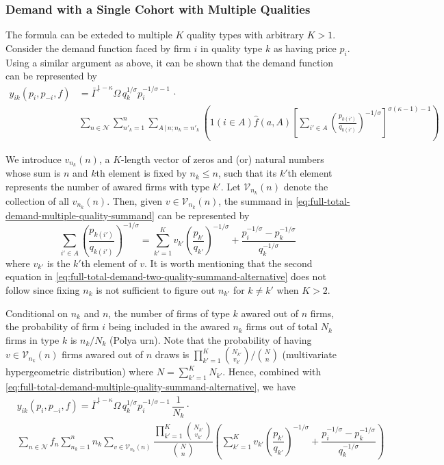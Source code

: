 \documentclass[12pt]{article}
\begin{document}
\subsubsection{Demand with a Single Cohort with Multiple Qualities}
The formula can be exteded to multiple $K$ quality types with arbitrary $K > 1$. Consider the demand function faced by firm $i$ in quality type $k$ as having price $p_i$. Using a similar argument as above, it can be shown that the demand function can be represented by
\begin{align}
y_{ik}(p_i, p_{-i}, f) 
&= \bar{\Gamma}^{1-\kappa}\Omega \, q_k^{1/\sigma}p_i^{-1/\sigma - 1}\, \cdot \\ 
&\sum_{n \in \mathcal{N} } \sum_{n'_k =1}^n \sum_{{A}\,|\,n; n_k = n'_k}\left( 1( i \in A ) \hat{f}(a,A)\left[\sum_{i'\in A}\left( \frac{p_{k(i')}}{q_{k(i')}}\right)^{-1/\sigma}\right]^{\sigma (\kappa - 1)-1}\right)  
\label{eq:full-total-demand-multiple-quality-summand}
\end{align}

We introduce $v_{n_k} (n)$, a $K$-length vector of zeros and (or) natural numbers whose sum is $n$ and $k$th element is fixed by $n_k \leq n$, such that its $k'$th element represents the number of awared firms with type $k'$. Let $\mathcal{V}_{n_k} (n)$ denote the collection of all $v_{n_k} (n)$. Then, given $v \in \mathcal{V}_{n_k} (n)$, the summand in \eqref{eq:full-total-demand-multiple-quality-summand} can be represented by
\begin{equation}
\sum_{i'\in A}\left( \frac{p_{k(i')}}{q_{k(i')}}\right)^{-1/\sigma} = 
\sum_{k' =1 }^{K} v_{k'} \left( \dfrac{p_{k'}}{q_{k'}}  \right)^{-1/\sigma} +   
\dfrac{p_i^{-1/\sigma}   - p^{-1/\sigma}_{k} }{{ q_k^{-1/\sigma }}}
\label{eq:full-total-demand-multiple-quality-summand-alternative}
\end{equation}
where $v_{k'}$ is the $k'$th element of $v$. It is worth mentioning that the second equation in \eqref{eq:full-total-demand-two-quality-summand-alternative} does not follow since fixing $n_k$ is not sufficient to figure out $n_{k'}$ for $k \neq k'$ when $K > 2$.

Conditional on $n_k$ and $n$, the number of firms of type $k$ awared out of $n$ firms, the probability of firm $i$ being included in the awared $n_k$ firms out of total $N_k$ firms in type $k$ is $n_k / N_k$ (Polya urn). Note that the probability of having $v \in \mathcal{V}_{n_k}(n)$ firms awared out of $n$ draws is $\prod_{k'=1}^K \binom{ N_{k'} }{ v_{k'} } / \binom{N}{n}$ (multivariate hypergeometric distribution) where $N = \sum_{k'=1}^K N_{k'}$. Hence, combined with \eqref{eq:full-total-demand-multiple-quality-summand-alternative}, we have
\begin{align}
& y_{ik}(p_i, p_{-i}, f) 
=  \bar{\Gamma}^{1-\kappa}\Omega \, q_k^{1/\sigma}p_i^{-1/\sigma - 1}\, \dfrac{1}{N_k} \cdot \\ 
&\sum_{n \in \mathcal{N} } f_n   \sum_{n_k =1}^n  
n_k \sum_{v \in \mathcal{V}_{n_k} (n)} 
\dfrac{\prod_{k'=1}^K \binom{ N_{k'} }{ v_{k'} } }{\binom{N}{n}}
\left( 
\sum_{k' =1 }^{K} v_{k'} \left( \dfrac{p_{k'}}{q_{k'}}  \right)^{-1/\sigma} +   
\dfrac{p_i^{-1/\sigma}   - p^{-1/\sigma}_{k} }{{ q_k^{-1/\sigma }}}
\right)  
\end{align}
\end{document}
